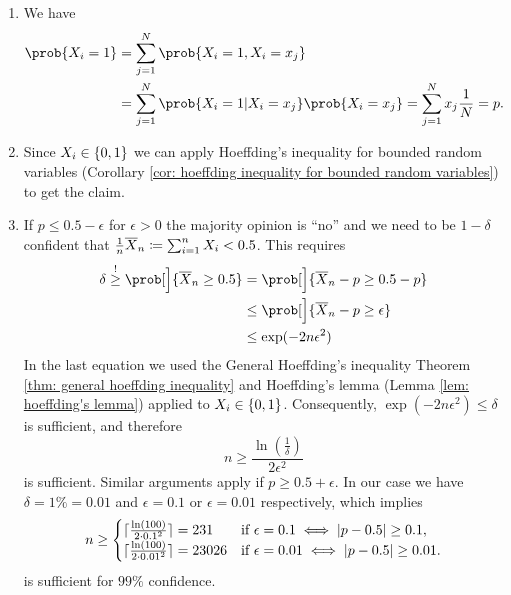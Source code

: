 \begin{solution}
\begin{enumerate}[wide=0pt]
    \item[\ref{it: (single issue polling) distribution}]
    We have
    \begin{align*}
        \prob{X_i = 1}
        &= \sum_{j=1}^N \prob{X_i = 1, X_i = x_j}
        \\
        &= \sum_{j=1}^N \prob{X_i = 1 | X_i = x_j} \prob{X_i = x_j}
        = \sum_{j=1}^N x_j \frac1N = p.
    \end{align*}

    \item[\ref{it: (single issue polling) PAC bound}]
    Since \(X_i \in \{0,1\}\) we can apply Hoeffding's inequality for
    bounded random variables (Corollary \ref{cor: hoeffding inequality for
    bounded random variables}) to get the claim.

    \item[\ref{it: (single issue polling) sample complexity}]
    If \(p \le 0.5 - \epsilon\) for \(\epsilon >0\) the majority opinion
    is ``no'' and we need to be \(1-\delta\) confident that \(\frac1n
    \overline{X}_n \coloneq \sum_{i=1}^n X_i < 0.5\). This requires
    \begin{align*}
        \delta \overset{!}\ge \prob[\Big]{\mean{X}_n \ge 0.5}
        &= \prob[\Big]{\mean{X}_n - p \ge 0.5 - p}
        \\
        &\le \prob[\Big]{\mean{X}_n - p \ge \epsilon}
        \\
        &\le \exp(-2n \epsilon^2)
    \end{align*}
    In the last equation we used the General Hoeffding's inequality
    Theorem \ref{thm: general hoeffding inequality} and Hoeffding's
    lemma (Lemma \ref{lem: hoeffding's lemma}) applied to \(X_i \in
    \{0,1\}\).
    Consequently, \(\exp(-2n \epsilon^2) \le \delta\) is sufficient, and therefore
    \[
        n \ge \frac{\ln(\frac1\delta)}{2\epsilon^2}
    \]
    is sufficient.  Similar arguments apply if \(p \ge 0.5 + \epsilon\).
    In our case we
    have \(\delta = 1\% = 0.01\) and \(\epsilon = 0.1\) or \(\epsilon =
    0.01\) respectively, which implies
    \[
        n \ge \begin{cases}
            \lceil\frac{\ln(100)}{2 \cdot 0.1^2}\rceil = 231 & \text{if } \epsilon = 0.1 \iff \lvert p-0.5\rvert \ge 0.1,
            \\
            \lceil\frac{\ln(100)}{2 \cdot 0.01^2}\rceil = 23026 & \text{if } \epsilon = 0.01 \iff \lvert p-0.5\rvert \ge 0.01.
        \end{cases}
    \]
    is sufficient for \(99\%\) confidence.
    \qedhere
\end{enumerate} 
\end{solution}
